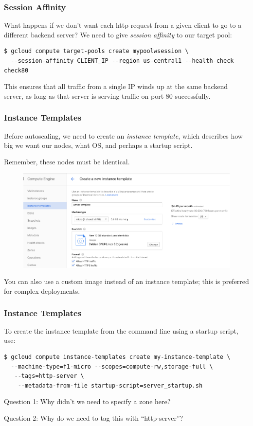 \documentclass[9pt]{beamer}
\begin{document}
\begin{frame}[fragile]
  \frametitle{Session Affinity}
  What happens if we don't want each http request from a given client to go to a different backend server? We need to give \emph{session affinity} to our target pool:
  \begin{verbatim}
$ gcloud compute target-pools create mypoolwsession \
  --session-affinity CLIENT_IP --region us-central1 --health-check check80
  \end{verbatim}
  This ensures that all traffic from a single IP winds up at the same backend server, as long as that server is serving traffic on port 80 successfully.
\end{frame}

\begin{frame}[fragile]
  \frametitle{Instance Templates}
  Before autoscaling, we need to create an \emph{instance template}, which describes how big we want our nodes, what OS, and perhaps a startup script.
  
  Remember, these nodes must be identical.
  \begin{figure}
    \includegraphics[scale=0.3]{figures/InstanceTemplate.png}
  \end{figure}
  You can also use a custom image instead of an instance template; this is preferred for complex deployments.
\end{frame}

\begin{frame}[fragile]
\frametitle{Instance Templates}
To create the instance template from the command line using a startup script, use:
\begin{verbatim}
$ gcloud compute instance-templates create my-instance-template \
  --machine-type=f1-micro --scopes=compute-rw,storage-full \
   --tags=http-server \
    --metadata-from-file startup-script=server_startup.sh
\end{verbatim}
Question 1: Why didn't we need to specify a zone here?

Question 2: Why do we need to tag this with ``http-server''?
\end{frame}
\end{document}
